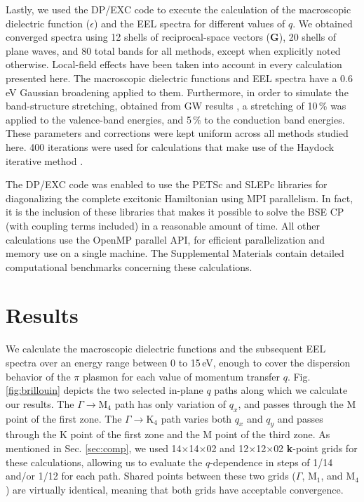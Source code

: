 \documentclass[aps,prb,10pt,showpacs,superscriptaddress,twocolumn,notitlepage]{revtex4-1}
\begin{document}
Lastly, we used the DP/EXC code \cite{olevanoDP, reiningEXC} to execute the
calculation of the macroscopic dielectric function ($\epsilon$) and the EEL
spectra for different values of $q$. We obtained converged spectra using 12
shells of reciprocal-space vectors ($\mathbf{G}$), 20 shells of plane waves, and
80 total bands for all methods, except when explicitly noted otherwise.
Local-field effects have been taken into account in every calculation presented
here. The macroscopic dielectric functions and EEL spectra have a 0.6\,eV
Gaussian broadening applied to them. Furthermore, in order to simulate the
band-structure stretching, obtained from GW results \cite{olevano}, a
stretching of 10\,\% was applied to the valence-band energies, and 5\,\% to the
conduction band energies. These parameters and corrections were kept uniform
across all methods studied here. 400 iterations were used for calculations that
make use of the Haydock iterative method \cite{haydockJPC72, haydockCPC80,
benedictPRB99, roccaJCP08, gruningCMS11, ljungbergPRB15}.

The DP/EXC code was enabled to use the PETSc \cite{petsc} and SLEPc
\cite{hernandezTOMS05} libraries for diagonalizing \cite{reshetnyakthesis} the
complete excitonic Hamiltonian using MPI parallelism. In fact, it is the
inclusion of these libraries that makes it possible to solve the BSE CP (with
coupling terms included) in a reasonable amount of time. All other calculations
use the OpenMP parallel API, for efficient parallelization and memory use on a
single machine. The Supplemental Materials contain detailed computational
benchmarks concerning these calculations.


\section{Results}\label{sec:results}

We calculate the macroscopic dielectric functions and the subsequent EEL spectra
over an energy range between 0 to 15\,eV, enough to cover the dispersion behavior
of the $\pi$ plasmon for
each value of momentum transfer $q$. Fig. \ref{fig:brillouin} depicts the two
selected in-plane $q$ paths along which we calculate our results. The $\Gamma
\rightarrow \mathrm{M}_{4}$ path has only variation of $q_{x}$, and passes
through the M point of the first zone. The $\Gamma \rightarrow \mathrm{K}_{4}$
path varies both $q_{x}$ and $q_{y}$ and passes through the K point of the first
zone and the M point of the third zone. As mentioned in Sec. \ref{sec:comp}, we
used 14$\times$14$\times$02 and 12$\times$12$\times$02 \textbf{k}-point grids
for these calculations, allowing us to evaluate the $q$-dependence in steps of
1/14 and/or 1/12 for each path. Shared points between these two grids ($\Gamma$,
M$_{1}$, and M$_{4}$) are virtually identical, meaning that both grids have
acceptable convergence.
\end{document}
